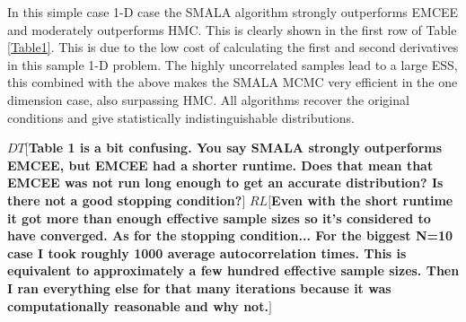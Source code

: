 \documentclass{aa}
\def\memodt#1{\color{green}$DT[${\bf #1}$]$ \color{black}}
\def\memorl#1{\color{gray}$RL[${\bf #1}$]$ \color{black}}
\begin{document}
In this simple case 1-D case the SMALA algorithm strongly outperforms EMCEE and moderately outperforms HMC. 
This is clearly shown in the first row of Table \ref{Table1}.
This is due to the low cost of calculating the first and second derivatives in this sample 1-D problem. 
The highly uncorrelated samples lead to a large ESS, this combined with the above makes the SMALA MCMC very efficient in the one dimension case, also surpassing HMC. All algorithms recover the original conditions and give statistically indistinguishable distributions.

\memodt{Table 1 is a bit confusing. You say SMALA strongly outperforms EMCEE, but EMCEE had a shorter runtime. Does that mean that EMCEE was not run long enough to get an accurate distribution? Is there not a good stopping condition?}
\memorl{Even with the short runtime it got more than enough effective sample sizes so it's considered to have converged. 
As for the stopping condition... For the biggest N=10 case I took roughly 1000 average autocorrelation times.  This is equivalent to approximately a few hundred effective sample sizes. Then I ran everything else for that many iterations because it was computationally reasonable and why not.}

\begin{table}
\caption{MCMC Efficiency Results}             %
\label{Table1}      %
\centering                         
{}
\end{table}
\end{document}
